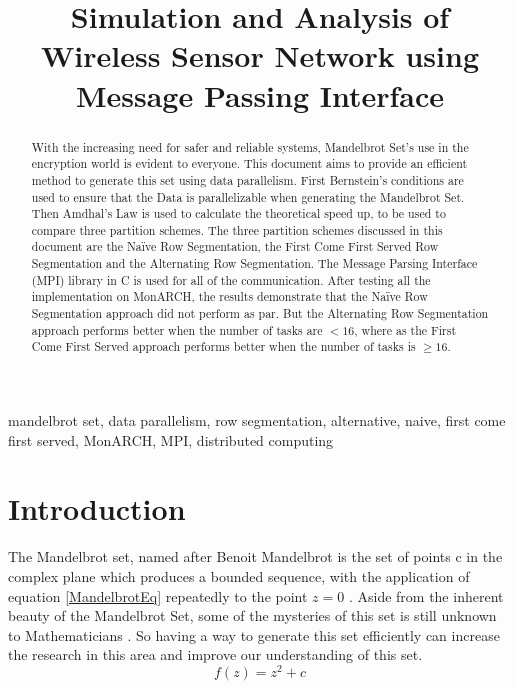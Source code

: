 \documentclass[conference]{IEEEtran}
\begin{document}
	
	\title{Simulation and Analysis of Wireless Sensor Network using Message Passing Interface }
	
	\author{
		}
	\maketitle
	
	\begin{abstract}
		With the increasing need for safer and reliable systems, Mandelbrot Set's use in the encryption world is evident to everyone. This document aims to provide an efficient method to generate this set using data parallelism. First Bernstein's conditions \cite{bernstein1996analysis} are used to ensure that the Data is parallelizable when generating the Mandelbrot Set. Then Amdhal's Law is used \cite{amdahl1967validity} to calculate the theoretical speed up, to be used to compare three partition schemes. The three partition schemes discussed in this document are the Naïve Row Segmentation, the First Come First Served Row Segmentation and the Alternating Row Segmentation. The Message Parsing Interface (MPI) library in C \cite{openmpi} is used for all of the communication. After testing all the implementation on MonARCH, the results demonstrate that the Naïve Row Segmentation approach did not perform as par. But the Alternating Row Segmentation approach performs better when the number of tasks are $< 16$, where as the First Come First Served approach performs better when the number of tasks is $\ge 16$. 
	\end{abstract}

	
	\begin{IEEEkeywords}
		mandelbrot set, data parallelism, row segmentation, alternative, naive, first come first served, MonARCH, MPI, distributed computing
	\end{IEEEkeywords}
	
	\section{Introduction}

	The Mandelbrot set, named after Benoit Mandelbrot is the set of points c in the complex plane which produces a bounded sequence, with the application of equation \ref{MandelbrotEq} repeatedly to the point $z=0$ \cite{Mandelbrotset}. Aside from the inherent beauty of the Mandelbrot Set, some of the mysteries of this set is still unknown to Mathematicians \cite{lamb_2017}. So having a way to generate this set efficiently can increase the research in this area and improve our understanding of this set. 
	\begin{equation}
		f(z)=z^{2} + c \label{MandelbrotEq}
	\end{equation}
	
\end{document}
